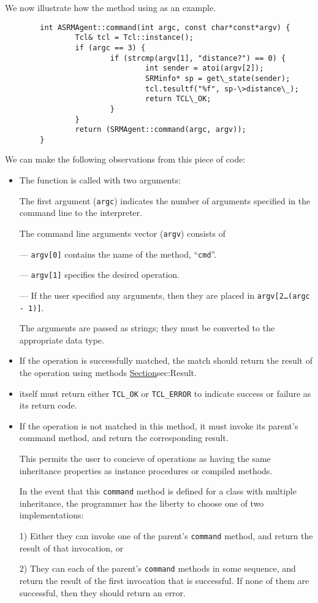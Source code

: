 We now illustrate how the  method using
 as an example.
\begin{verbatim}
        int ASRMAgent::command(int argc, const char*const*argv) {
                Tcl& tcl = Tcl::instance();
                if (argc == 3) {
                        if (strcmp(argv[1], "distance?") == 0) {
                                int sender = atoi(argv[2]);
                                SRMinfo* sp = get\_state(sender);
                                tcl.tesultf("%f", sp-\>distance\_);
                                return TCL\_OK;
                        }
                }
                return (SRMAgent::command(argc, argv));
        }
\end{verbatim}
We can make the following observations from this piece of code:
\begin{itemize}
\item The function is called with two arguments:
  
  The first argument ({\tt argc}) indicates
  the number of arguments specified in the command line to the interpreter.

  The command line arguments vector ({\tt argv}) consists of
  
  --- {\tt argv[0]} contains the name of the method, ``{\tt cmd}''.

  --- {\tt argv[1]} specifies the desired operation.

  --- If the user specified any arguments, then they are placed in
  {\tt argv[2\ldots(argc - 1)]}.

  The arguments are passed as strings;
  they must be converted to the appropriate data type.
\item If the operation is successfully matched,
  the match should return the result of the operation
  using methods \href{described earlier}{Section}{sec:Result}.
\item {} itself must return either {\tt TCL\_OK} or {\tt TCL\_ERROR}
  to indicate success or failure as its return code.
\item If the operation is not matched in this method, it must
  invoke its parent's command method, and return the corresponding result.

  This permits the user to concieve of operations as having the same
  inheritance properties as instance procedures or compiled methods.

  In the event that this {\tt command} method 
  is defined for a class with multiple inheritance,
  the programmer has the liberty to choose one of two implementations:

  1) Either they can invoke one of the parent's {\tt command} method,
  and return the result of that invocation, or

  2) They can each of the parent's {\tt command} methods in some sequence,
  and return the result of the first invocation that is successful.
  If none of them are successful, then they should return an error.
\end{itemize}
